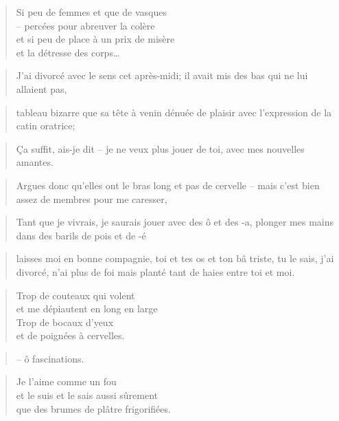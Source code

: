   \begin{verse}
    Si peu de femmes et que de vasques\\
    -- percées pour abreuver la colère\\
    et si peu de place à un prix de misère\\
    et la détresse des corps…
  \end{verse}
  \begin{verse}
    J’ai divorcé avec le  sens cet après-midi; il avait mis  des bas qui ne
    lui allaient pas,
  \end{verse}
  \begin{verse}
    tableau  bizarre   que  sa  tête   à  venin  dénuée  de   plaisir  avec
    l’expression de la catin oratrice;
  \end{verse}
  \begin{verse}
    Ça suffit, ais-je dit -- je ne  veux plus jouer de toi, avec mes nouvelles
    amantes.
  \end{verse}
  \begin{verse}
    Argues donc qu’elles ont le bras long  et pas de cervelle -- mais c’est
    bien assez de membres pour me caresser,
  \end{verse}
  \begin{verse}
    Tant que je  vivrais, je saurais jouer  avec des ô et des  -a, plonger mes
    mains dans des barils de pois et de -é
  \end{verse}
  \begin{verse}
    laisses moi  en bonne compagnie,  toi et  tes os et  ton bâ triste,  tu le
    sais, j’ai divorcé, n’ai plus de  foi mais planté tant de haies entre
    toi et moi.
  \end{verse}
  \begin{verse}
    Trop de couteaux qui volent\\
    et me dépiautent en long en large\\
    Trop de bocaux d’yeux\\
    et de poignées à cervelles.
  \end{verse}
  \begin{verse}
    -- ô fascinations.
  \end{verse}
  \begin{verse}
    Je l’aime comme un fou\\
    et le suis et le sais aussi sûrement\\
    que des brumes de plâtre frigorifiées.
  \end{verse}
